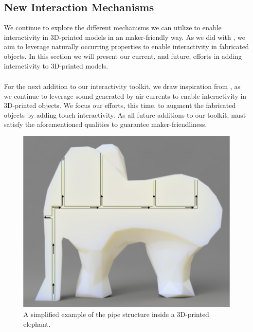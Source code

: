     \subsection{New Interaction Mechanisms}
      We continue to explore the different mechanisms we can utilize to enable
      interactivity in 3D-printed models in an maker-friendly way. As we did
      with \bh, we aim to leverage naturally occurring properties to
      enable interactivity in fabricated objects. In this section we will
      present our current, and future, efforts in adding interactivity to 3D-printed models.
      
      \subsubsection{\at}
        For the next addition to our interactivity toolkit, we draw inspiration
        from \bh, as we continue to leverage sound generated by air
        currents to enable interactivity in 3D-printed objects. We focus our
        efforts, this time, to augment the fabricated objects by adding touch
        interactivity. As all future additions to our toolkit, \at must
        satisfy the aforementioned qualities to guarantee
        maker-friendliness.
        
        \begin{figure}
          \centering
            \includegraphics[width=.9\columnwidth]{figures/elephant-airtouch.png}
            \caption{A simplified example of the pipe structure inside a
            3D-printed elephant.}
            \label{fig:elephant-airtouch}
        \end{figure}
        
